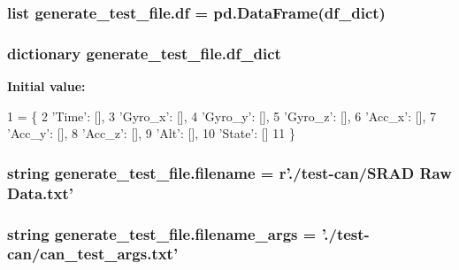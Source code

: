 \hypertarget{namespacegenerate__test__file_ad42c259673c60b9a04a9473cd53341e2}{
\subsubsection[{df}]{\setlength{\rightskip}{0pt plus 5cm}list generate\-\_\-test\-\_\-file.\-df = pd.\-Data\-Frame({\bf df\-\_\-dict})}}\label{namespacegenerate__test__file_ad42c259673c60b9a04a9473cd53341e2}
\hypertarget{namespacegenerate__test__file_a901a3dccd6aeba8324f62b08a13f7b90}{
\subsubsection[{df\-\_\-dict}]{\setlength{\rightskip}{0pt plus 5cm}dictionary generate\-\_\-test\-\_\-file.\-df\-\_\-dict}}\label{namespacegenerate__test__file_a901a3dccd6aeba8324f62b08a13f7b90}
{\bfseries Initial value\-:}
\begin{DoxyCode}
1 = \{
2     \textcolor{stringliteral}{'Time'}: [],
3     \textcolor{stringliteral}{'Gyro\_x'}: [],
4     \textcolor{stringliteral}{'Gyro\_y'}: [],
5     \textcolor{stringliteral}{'Gyro\_z'}: [],
6     \textcolor{stringliteral}{'Acc\_x'}: [],
7     \textcolor{stringliteral}{'Acc\_y'}: [],
8     \textcolor{stringliteral}{'Acc\_z'}: [],
9     \textcolor{stringliteral}{'Alt'}: [],
10     \textcolor{stringliteral}{'State'}: []
11 \}
\end{DoxyCode}
\hypertarget{namespacegenerate__test__file_af97ace4c580ad8a8a1468e21ae2d2b0a}{
\subsubsection[{filename}]{\setlength{\rightskip}{0pt plus 5cm}string generate\-\_\-test\-\_\-file.\-filename = r'./test-\/can/S\-R\-A\-D Raw Data.\-txt'}}\label{namespacegenerate__test__file_af97ace4c580ad8a8a1468e21ae2d2b0a}
\hypertarget{namespacegenerate__test__file_a743ab44655d3357940e12b19cffa1e59}{
\subsubsection[{filename\-\_\-args}]{\setlength{\rightskip}{0pt plus 5cm}string generate\-\_\-test\-\_\-file.\-filename\-\_\-args = './test-\/can/can\-\_\-test\-\_\-args.\-txt'}}\label{namespacegenerate__test__file_a743ab44655d3357940e12b19cffa1e59}
